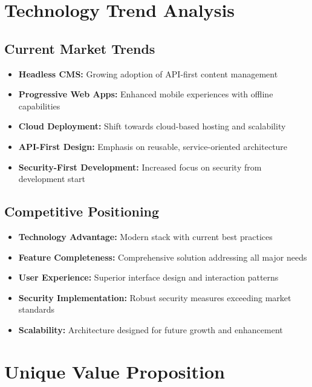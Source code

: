 \documentclass[12pt,a4paper]{report}
\begin{document}
\section{Technology Trend Analysis}

\subsection{Current Market Trends}
\begin{itemize}
    \item \textbf{Headless CMS:} Growing adoption of API-first content management
    \item \textbf{Progressive Web Apps:} Enhanced mobile experiences with offline capabilities
    \item \textbf{Cloud Deployment:} Shift towards cloud-based hosting and scalability
    \item \textbf{API-First Design:} Emphasis on reusable, service-oriented architecture
    \item \textbf{Security-First Development:} Increased focus on security from development start
\end{itemize}

\subsection{Competitive Positioning}
\begin{itemize}
    \item \textbf{Technology Advantage:} Modern stack with current best practices
    \item \textbf{Feature Completeness:} Comprehensive solution addressing all major needs
    \item \textbf{User Experience:} Superior interface design and interaction patterns
    \item \textbf{Security Implementation:} Robust security measures exceeding market standards
    \item \textbf{Scalability:} Architecture designed for future growth and enhancement
\end{itemize}

\section{Unique Value Proposition}
\end{document}
